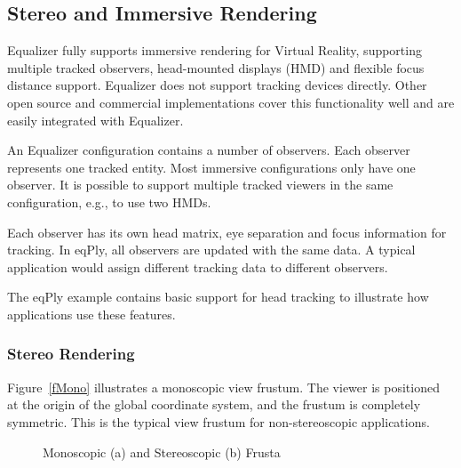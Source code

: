 \documentclass[10pt,a4]{scrartcl}
\newcommand{\fig}[1]{Figure~\ref{#1}}
\begin{document}
\subsection{\label{sTracking}Stereo and Immersive Rendering}

Equalizer fully supports immersive rendering for Virtual Reality, supporting
multiple tracked observers, head-mounted displays (HMD) and flexible focus
distance support. Equalizer does not support tracking devices directly. Other
open source and commercial implementations cover this functionality well
and are easily integrated with Equalizer.

An Equalizer configuration contains a number of observers. Each observer
represents one tracked entity. Most immersive configurations only have one
observer. It is possible to support multiple tracked viewers in the same
configuration, e.g., to use two HMDs.

Each observer has its own head matrix, eye separation and focus information for
tracking. In \textsf{eqPly}, all observers are updated with the same data. A
typical application would assign different tracking data to different observers.

The \textsf{eqPly} example contains basic support for head tracking to
illustrate how applications use these features.

\subsubsection{Stereo Rendering}

\fig{fMono} illustrates a monoscopic view frustum. The viewer is
positioned at the origin of the global coordinate system, and the
frustum is completely symmetric. This is the typical view frustum for
non-stereoscopic applications.

\begin{figure}[h!t]\center
  \hfil
  {\caption{Monoscopic (a) and Stereoscopic (b) Frusta}}
\end{figure}
\end{document}

